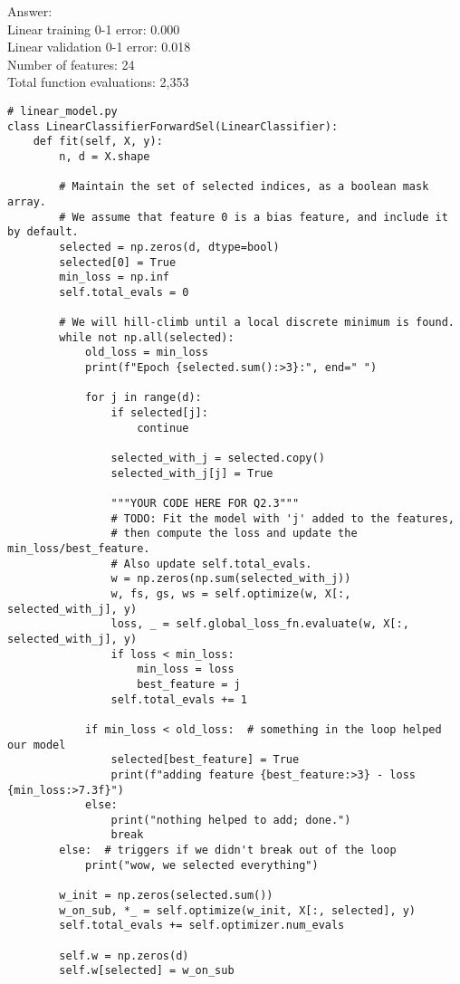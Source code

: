 \documentclass{article}
\newcommand{\gre}[1]{\textcolor{gre}{#1}}
\newcommand\ans[1]{\par\gre{Answer: #1}}
\begin{document}
\ans{\\
Linear training 0-1 error: 0.000\\
Linear validation 0-1 error: 0.018\\
Number of features: 24\\
Total function evaluations: 2,353\\
}
\newpage
\begin{verbatim}
# linear_model.py
class LinearClassifierForwardSel(LinearClassifier):
    def fit(self, X, y):
        n, d = X.shape

        # Maintain the set of selected indices, as a boolean mask array.
        # We assume that feature 0 is a bias feature, and include it by default.
        selected = np.zeros(d, dtype=bool)
        selected[0] = True
        min_loss = np.inf
        self.total_evals = 0

        # We will hill-climb until a local discrete minimum is found.
        while not np.all(selected):
            old_loss = min_loss
            print(f"Epoch {selected.sum():>3}:", end=" ")

            for j in range(d):
                if selected[j]:
                    continue

                selected_with_j = selected.copy()
                selected_with_j[j] = True

                """YOUR CODE HERE FOR Q2.3"""
                # TODO: Fit the model with 'j' added to the features,
                # then compute the loss and update the min_loss/best_feature.
                # Also update self.total_evals.
                w = np.zeros(np.sum(selected_with_j))
                w, fs, gs, ws = self.optimize(w, X[:, selected_with_j], y)
                loss, _ = self.global_loss_fn.evaluate(w, X[:, selected_with_j], y) 
                if loss < min_loss:
                    min_loss = loss
                    best_feature = j
                self.total_evals += 1
                
            if min_loss < old_loss:  # something in the loop helped our model
                selected[best_feature] = True
                print(f"adding feature {best_feature:>3} - loss {min_loss:>7.3f}")
            else:
                print("nothing helped to add; done.")
                break
        else:  # triggers if we didn't break out of the loop
            print("wow, we selected everything")
            
        w_init = np.zeros(selected.sum())
        w_on_sub, *_ = self.optimize(w_init, X[:, selected], y)
        self.total_evals += self.optimizer.num_evals

        self.w = np.zeros(d)
        self.w[selected] = w_on_sub
\end{verbatim}
\end{document}
